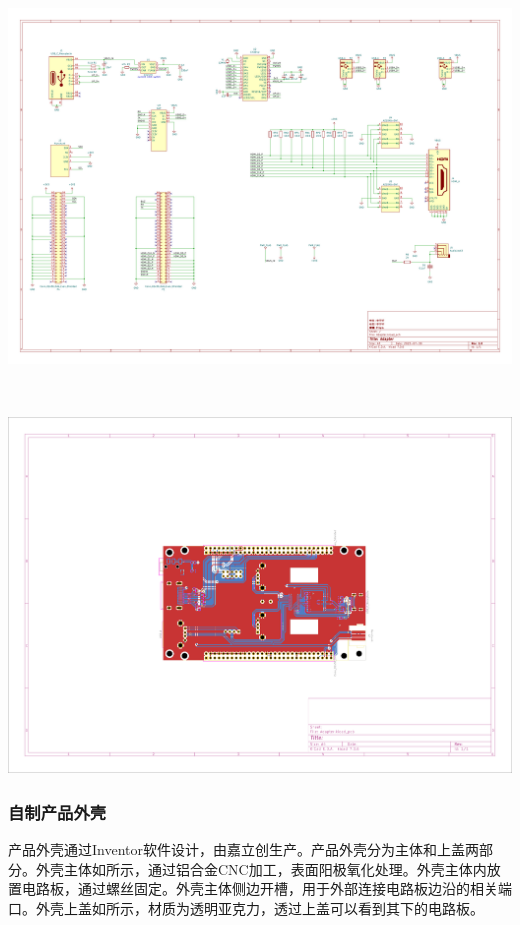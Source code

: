 \begin{Figure}[自制扩展板]
    \begin{FigureSub}[原理图]
        \includegraphics[width=14cm]{image/Adapter.pdf}
    \end{FigureSub}\\ \vspace{0.5cm}
    \begin{FigureSub}[版图]
        \includegraphics[width=14cm]{image/Adapter_PCB.pdf}
    \end{FigureSub}
\end{Figure}

\subsubsection{自制产品外壳}
产品外壳通过Inventor软件设计，由嘉立创生产。产品外壳分为主体和上盖两部分。外壳主体如所示，通过铝合金CNC加工，表面阳极氧化处理。外壳主体内放置电路板，通过螺丝固定。外壳主体侧边开槽，用于外部连接电路板边沿的相关端口。外壳上盖如所示，材质为透明亚克力，透过上盖可以看到其下的电路板。

